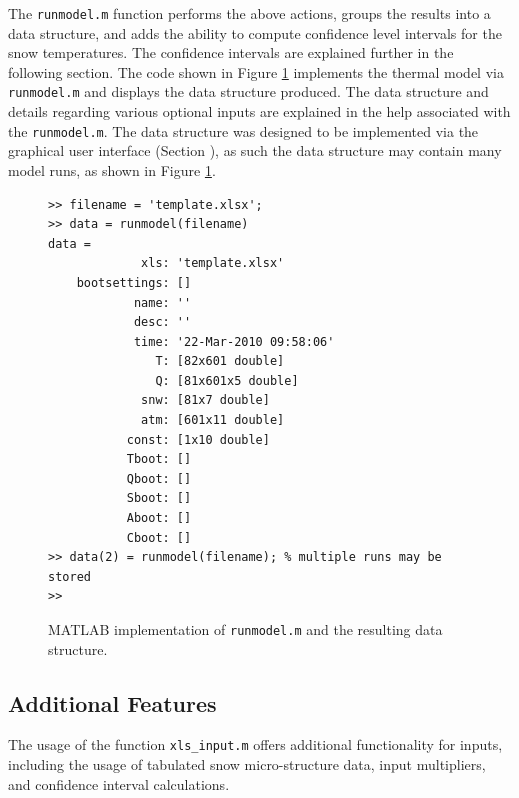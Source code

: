 The \texttt{runmodel.m} function performs the above actions, groups the results into a data structure, and adds the ability to compute confidence level intervals for the snow temperatures.  The confidence intervals are explained further in the following section.  The code shown in Figure \ref{TM:fig:runmodel} implements the thermal model via \texttt{runmodel.m} and displays the data structure produced.  The data structure and details regarding various optional inputs are explained in the help associated with the \texttt{runmodel.m}.  The data structure was designed to be implemented via the graphical user interface (Section ), as such the data structure may contain many model runs, as shown in Figure \ref{TM:fig:runmodel}.

\begin{figure}[ht!]
\begin{singlespaced}\begin{lstlisting}[style=figure]
>> filename = 'template.xlsx';
>> data = runmodel(filename)
data = 
             xls: 'template.xlsx'
    bootsettings: []
            name: ''
            desc: ''
            time: '22-Mar-2010 09:58:06'
               T: [82x601 double]
               Q: [81x601x5 double]
             snw: [81x7 double]
             atm: [601x11 double]
           const: [1x10 double]
           Tboot: []
           Qboot: []
           Sboot: []
           Aboot: []
           Cboot: []
>> data(2) = runmodel(filename); % multiple runs may be stored
>> 
\end{lstlisting}\end{singlespaced}
\caption{MATLAB implementation of \texttt{runmodel.m} and the resulting data structure.}
\label{TM:fig:runmodel}
\end{figure}

\subsection{Additional Features}\label{TM:sec:features}
The usage of the function \texttt{xls\_input.m} offers additional functionality for inputs, including the usage of tabulated snow micro-structure data, input multipliers, and confidence interval calculations.

